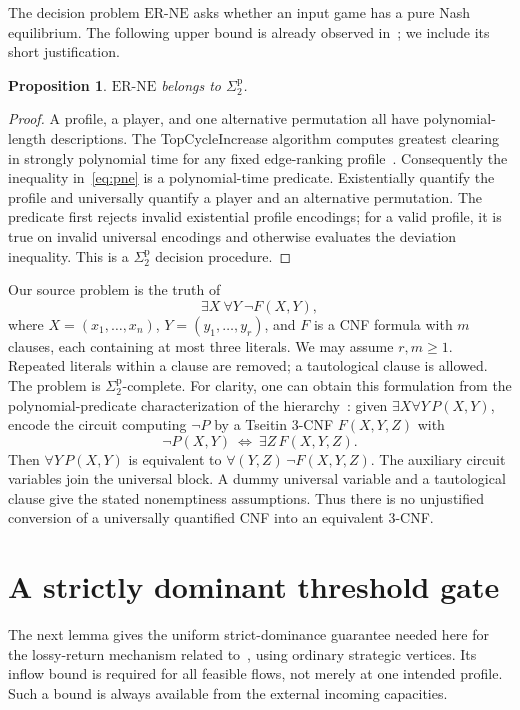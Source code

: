 \documentclass[11pt]{article}
\newtheorem{proposition}[theorem]{Proposition}
\newcommand{\sig}{\Sigma^{\mathrm p}_2}
\begin{document}
The decision problem $\mathrm{ER\text{-}NE}$ asks whether an input game has a pure Nash equilibrium. The following upper bound is already observed in~\cite[Remark~3]{bhs}; we include its short justification.
\begin{proposition}\label{prop:upper}
$\mathrm{ER\text{-}NE}$ belongs to $\sig$.
\end{proposition}
\begin{proof}
A profile, a player, and one alternative permutation all have polynomial-length descriptions. The TopCycleIncrease algorithm computes greatest clearing in strongly polynomial time for any fixed edge-ranking profile~\cite[Proposition~5]{bhs}. Consequently the inequality in~\eqref{eq:pne} is a polynomial-time predicate. Existentially quantify the profile and universally quantify a player and an alternative permutation. The predicate first rejects invalid existential profile encodings; for a valid profile, it is true on invalid universal encodings and otherwise evaluates the deviation inequality. This is a $\sig$ decision procedure.
\end{proof}

Our source problem is the truth of
\begin{equation}\label{eq:qbf}
 \exists X\ \forall Y\ \neg F(X,Y),
\end{equation}
where $X=(x_1,\ldots,x_n)$, $Y=(y_1,\ldots,y_r)$, and $F$ is a CNF formula with $m$ clauses, each containing at most three literals. We may assume $r,m\ge1$. Repeated literals within a clause are removed; a tautological clause is allowed. The problem is $\sig$-complete. For clarity, one can obtain this formulation from the polynomial-predicate characterization of the hierarchy~\cite{stockmeyer}: given $\exists X\forall Y\,P(X,Y)$, encode the circuit computing $\neg P$ by a Tseitin 3-CNF $F(X,Y,Z)$ with
\[
 \neg P(X,Y)\ \Longleftrightarrow\ \exists Z\,F(X,Y,Z).
\]
Then $\forall Y\,P(X,Y)$ is equivalent to $\forall(Y,Z)\,\neg F(X,Y,Z)$. The auxiliary circuit variables join the universal block. A dummy universal variable and a tautological clause give the stated nonemptiness assumptions. Thus there is no unjustified conversion of a universally quantified CNF into an equivalent 3-CNF.

\section{A strictly dominant threshold gate}
The next lemma gives the uniform strict-dominance guarantee needed here for the lossy-return mechanism related to~\cite{kkz}, using ordinary strategic vertices. Its inflow bound is required for all feasible flows, not merely at one intended profile. Such a bound is always available from the external incoming capacities.
\end{document}
